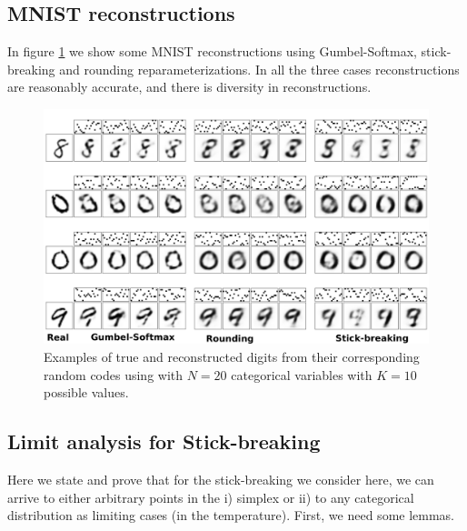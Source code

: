 \documentclass[twoside]{article}
\begin{document}

\subsection*{MNIST reconstructions}
In figure \ref{fig:VAE} we show some MNIST  reconstructions using Gumbel-Softmax, stick-breaking and rounding reparameterizations. In all the three cases reconstructions are reasonably accurate, and there is diversity in reconstructions.
\begin{figure}[t]
  \centering
  \includegraphics[width=5.in]{../figures/figure4.pdf} 
  \caption{Examples of true and reconstructed digits from their corresponding random codes using with $N=20$ categorical variables with $K=10$ possible values.
  }
\label{fig:VAE}
\end{figure}

\subsection*{Limit analysis for Stick-breaking}

Here we state and prove that for  the stick-breaking we consider here, we can arrive to either arbitrary points in the i) simplex or ii) to any categorical distribution as limiting cases (in the temperature).  First, we need some lemmas.
\end{document}
